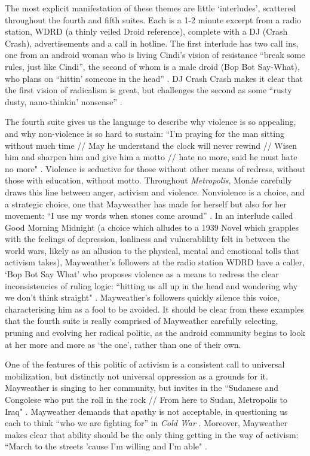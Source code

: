 \documentclass[a4paper, 11pt]{article} %
\begin{document}
The most explicit manifestation of these themes are little `interludes', scattered throughout the fourth and fifth suites.
Each is a 1-2 minute excerpt from a radio station, WDRD (a thinly veiled Droid reference), complete with a DJ (Crash Crash), advertisements and a call in hotline.
The first interlude has two call ins, one from an android woman who is living Cindi's vision of resistance ``break some rules, just like Cindi'', the second of whom is a male droid (Bop Bot Say-What), who plans on ``hittin' someone in the head'' \cite{goodmorningmidnight}.
DJ Crash Crash makes it clear that the first vision of radicalism is great, but challenges the second as some ``rusty dusty, nano-thinkin' nonsense'' \cite{goodmorningmidnight}.

The fourth suite gives us the language to describe why violence is so appealing, and why non-violence is so hard to sustain:
``I'm praying for the man sitting without much time // May he understand the clock will never rewind // Wisen him and sharpen him and give him a motto // hate no more, said he must hate no more" \cite{danceordie}.
Violence is seductive for those without other means of redress, without those with education, without motto.
Throughout \emph{Metropolis}, Mon\'ae carefully draws this line between anger, activism and violence.
Nonviolence is a choice, and a strategic choice, one that Mayweather has made for herself  but also for her movement: ``I use my words when stones come around'' \cite{manymoons}.
In an interlude called Good Morning Midnight (a choice which alludes to a 1939 Novel which grapples with the feelings of depression, lonliness and vulnerablility felt in between the world wars, likely as an allusion to the physical, mental and emotional tolls that activism takes), Mayweather's followers at the radio station WDRD have a caller, `Bop Bot Say What' who proposes violence as a means to redress the clear inconsistencies of ruling logic: ``hitting us all up in the head and wondering why we don't think straight" \cite{chromeshoppe}.
Mayweather's followers quickly silence this voice, characterising him as a fool to be avoided. 
It should be clear from these examples that the fourth suite is really comprised of Mayweather carefully selecting, pruning and evolving her radical politic, as the android community begins to look at her more and more as `the one', rather than one of their own.


One of the features of this politic of activism is a consistent call to universal mobilization, but distinctly not universal oppression as a grounds for it.
Mayweather is singing to her community, but invites in the 
``Sudanese and Congolese who put the roll in the rock // From here to Sudan, Metropolis to Iraq" \cite{danceordie}.
Mayweather demands that apathy is not acceptable, in questioning us each to think ``who we are fighting for'' in \emph{Cold War} \cite{coldwar}.
Moreover, Mayweather makes clear that ability should be the only thing getting in the way of activism: 
``March to the streets 'cause I'm willing and I'm able" \cite{queen}.
\end{document}

